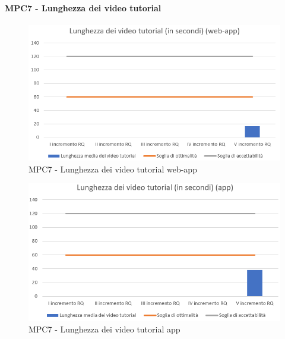   \newpage
  \paragraph{MPC7 - Lunghezza dei video tutorial}
  \begin{figure}[h!]
    \centering
      \includegraphics[scale=1]{Immagini/lunghVideoTut WA.PNG}
    \caption{MPC7 - Lunghezza dei video tutorial web-app}
  \end{figure}

  \begin{figure}[h!]
    \centering
      \includegraphics[scale=1]{Immagini/lunghVideoTut APP.PNG}
    \caption{MPC7 - Lunghezza dei video tutorial app}
  \end{figure}



  \newpage
